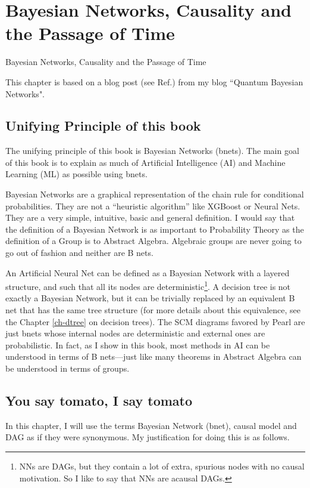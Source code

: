 \chapter*{Bayesian Networks, Causality and the
Passage of Time}
{Bayesian Networks, Causality and the
Passage of Time}

\label{ch0-passage-time}

This chapter is based
on a blog post (see Ref.\cite{bnets-passage-time})
from my blog ``Quantum Bayesian Networks".

\section{Unifying Principle of this book}
The unifying principle of this
book is Bayesian Networks (bnets).
The main goal of this book
is to explain
as much of Artificial Intelligence (AI)
and Machine Learning (ML)
as possible
using bnets.

Bayesian Networks are a graphical representation of the chain rule for
conditional probabilities.
 They are not a ``heuristic algorithm” like XGBoost or Neural Nets.
They are a very simple, intuitive, basic and general definition. I would say
that the definition of a Bayesian Network is as important to Probability
Theory as the definition of a Group is to Abstract Algebra. Algebraic groups
are never going to go out of fashion and neither are B nets.

An Artificial Neural Net can be defined as a Bayesian Network with a layered
structure, and such that all its nodes are deterministic\footnote{NNs
are DAGs, but they contain a lot of extra,
spurious nodes with no causal motivation. So I like to
say that NNs are acausal DAGs.}. A decision tree
is not exactly a Bayesian Network, but it can be trivially replaced by an
equivalent B net that has the same tree structure (for more details about
this equivalence, see the Chapter \ref{ch-dtree} on decision trees).
The SCM diagrams favored by Pearl are just bnets
whose internal nodes are deterministic and external ones
are probabilistic.
In fact, as I show in this book, most methods in AI can be
understood in terms of B nets---just
like many theorems in Abstract Algebra
can be understood in terms of groups.



\section{You say tomato, I say tomato}
In this chapter, I will use the terms Bayesian Network
(bnet), causal model and DAG as if they were synonymous.
My justification for doing this is as follows.


